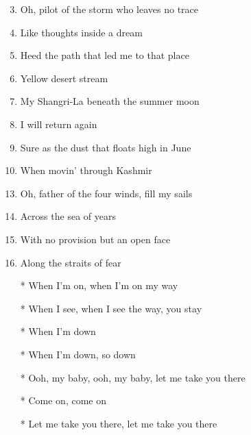 \documentclass{article}
\begin{document}
\begin{center}
\begin{enumerate}
            \pagebreak

            \item[]
            \item[] 
            \item Oh, pilot of the storm who leaves no trace
            \item Like thoughts inside a dream
            \item Heed the path that led me to that place
            \item Yellow desert stream
            \item My Shangri-La beneath the summer moon
            \item I will return again
            \item Sure as the dust that floats high in June
            \item When movin' through Kashmir

            \item[]
            \item[] 
            \item Oh, father of the four winds, fill my sails
            \item Across the sea of years
            \item With no provision but an open face
            \item Along the straits of fear

            \item[]
            \item[] \outro
            \item[*] When I'm on, when I'm on my way
            \item[*] When I see, when I see the way, you stay
            \item[*] When I'm down
            \item[*] When I'm down, so down
            \item[*] Ooh, my baby, ooh, my baby, let me take you there
            \item[*] Come on, come on
            \item[*] Let me take you there, let me take you there

        \end{enumerate}
    \end{center}
\end{document}
